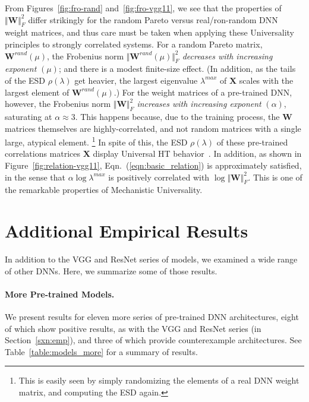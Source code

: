 {From Figures~\ref{fig:fro-rand} and~\ref{fig:fro-vgg11}, we see that the properties of $\Vert\mathbf{W}\Vert^{2}_{F}$ differ strikingly for the random Pareto versus real/ron-random DNN weight matrices, and thus care must be taken when applying these Universality principles to strongly correlated systems.
For a random Pareto matrix, $\mathbf{W}^{rand}(\mu)$, the Frobenius norm $\Vert\mathbf{W}^{rand}(\mu)\Vert^{2}_{F}$ \emph{decreases with increasing exponent} $(\mu)$; and there is a modest finite-size effect.
(In addition, as the tails of the ESD $\rho(\lambda)$ get heavier, the largest eigenvalue $\lambda^{max}$ of $\mathbf{X}$ scales with the largest element of $\mathbf{W}^{rand}(\mu)$.) 
For the weight matrices of a pre-trained DNN, however, the Frobenius norm $\Vert\mathbf{W}\Vert^{2}_{F}$ \emph{increases with increasing exponent} $(\alpha)$, saturating at $\alpha\approx 3$.
This happens because, due to the training process, the $\mathbf{W}$ matrices themselves are highly-correlated, and not random matrices with a single large, atypical element.%
\footnote{This is easily seen by simply randomizing the elements of a real DNN weight matrix, and computing the ESD again.}
In spite of this, the ESD $\rho(\lambda)$ of these pre-trained correlations matrices $\mathbf{X}$ display Universal HT behavior~\cite{MM18_TR}.
In addition, as shown in Figure~\ref{fig:relation-vgg11}, Eqn.~(\ref{eqn:basic_relation}) is approximately satisfied, in the sense that $\alpha\log\lambda^{max}$ is positively correlated with $\log\Vert\mathbf{W}\Vert^{2}_{F} $.
This is one of the remarkable properties of Mechanistic Universality.


\section{Additional Empirical Results}
\label{sxn:appendix-addl-empirical}

In addition to the VGG and ResNet series of models, we examined a wide range of other DNNs.
Here, we summarize some of those results.

\paragraph{More Pre-trained Models.}

We present results for eleven more series of pre-trained DNN architectures, eight of which show positive results, as with the VGG and ResNet series (in Section~\ref{sxn:emp}), and three of which provide counterexample architectures.
See Table~\ref{table:models_more} for a summary of results.

}
